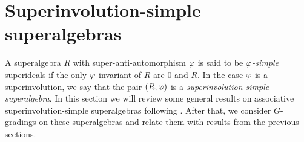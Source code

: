 





\section{Superinvolution-simple superalgebras}

A superalgebra $R$ with super-anti-automorphism $\varphi$ is said to be \emph{$\varphi$-simple} %
superideals if the only $\varphi$-invariant of $R$ are $0$ and $R$. 
In the case $\varphi$ is a superinvolution, we say that the pair $(R, \varphi)$ is a \emph{superinvolution-simple superalgebra}.
In this section we will review some general results on associative superinvolution-simple superalgebras following \cite{racine}. 
After that, we consider $G$-gradings on these superalgebras and relate them with results from the previous sections.


